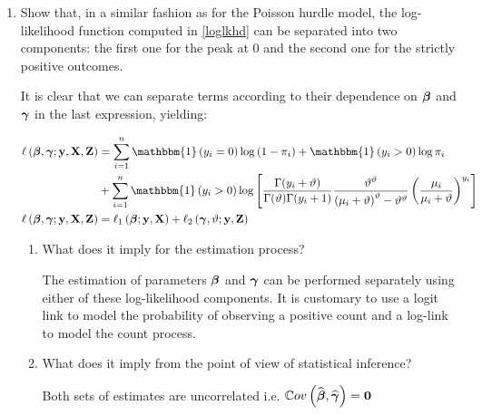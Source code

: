 \documentclass[a4paper,12pt]{article}\usepackage[]{graphicx}\usepackage[]{color}
\def\by{\mathbf{y}}
\def\bbeta{\mbox{\boldmath $\beta$}}
\def\bgamma{\mbox{\boldmath $\gamma$}}
\def\bX{\mathbf{X}}
\def\bZ{\mathbf{Z}}
\def\op{\left(}
\def\cp{\right)}
\def\oc{\left[}
\def\cc{\right]}
\begin{document}
\begin{enumerate}[ref=\bf{\alph*)}]
Yielding the likelihood : 
$$
\mathcal{L}\op \bbeta, \bgamma  ; \by ,  \bX , \bZ  \cp 
= \prod_{i=1}^n 
\oc 1- \pi_i \cc^{\mathbbm{1}\op y_i =  0 \cp}
\oc 
\pi_i
\frac {\Gamma(y_i+\vartheta)}{\Gamma(\vartheta)\Gamma(y_i+1)} 
\frac{\vartheta^\vartheta}{\op\mu_i+\vartheta\cp^\vartheta - \vartheta^\vartheta}
\op\frac{\mu_i}{\mu_i+\vartheta}\cp^{y_i} 
\cc^{\mathbbm{1}\op y_i >  0 \cp}
$$ 
And the log-likelihood : 
\begin{align*}
\ell\op \bbeta, \bgamma  ; \by ,  \bX , \bZ  \cp 
&= \sum_{i=1}^n 
{\mathbbm{1}\op y_i =  0 \cp} \log \op 1- \pi_i \cp + {\mathbbm{1}\op y_i >  0 \cp} \log \pi_i \\
&+ 
{\mathbbm{1}\op y_i >  0 \cp}\log 
\oc 
\frac {\Gamma(y_i+\vartheta)}{\Gamma(\vartheta)\Gamma(y_i+1)} 
\frac{\vartheta^\vartheta}{\op\mu_i+\vartheta\cp^\vartheta - \vartheta^\vartheta}
\op\frac{\mu_i}{\mu_i+\vartheta}\cp^{y_i} 
\cc 
\end{align*} 

\color{black}

\item{Show that, in a similar fashion as for the Poisson hurdle model, the log-likelihood function computed in \ref{loglkhd} can be separated into two components: the first one for the peak at 0 and the second one for the strictly positive outcomes.

\color{blue} 

It is clear that we can separate terms according to their dependence on $\bbeta$ and $\bgamma$ in the last expression, yielding:

\begin{align*}
\ell \op \bbeta, \bgamma  ; \by ,  \bX , \bZ  \cp 
&= \sum_{i=1}^n 
{\mathbbm{1}\op y_i =  0 \cp} \log \op 1- \pi_i \cp + {\mathbbm{1}\op y_i >  0 \cp} \log \pi_i \\
&+ 
\sum_{i=1}^n 
{\mathbbm{1}\op y_i >  0 \cp}\log 
\oc 
\frac {\Gamma(y_i+\vartheta)}{\Gamma(\vartheta)\Gamma(y_i+1)} 
\frac{\vartheta^\vartheta}{\op\mu_i+\vartheta\cp^\vartheta - \vartheta^\vartheta}
\op\frac{\mu_i}{\mu_i+\vartheta}\cp^{y_i} 
\cc \\
\ell \op \bbeta, \bgamma  ; \by ,  \bX , \bZ  \cp 
&= \ell_1\op\bbeta ; \by, \bX\cp + \ell_2\op \bgamma, \vartheta ; \by, \bZ \cp 
\end{align*}  
\color{black}
\begin{enumerate}
\item What does it imply for the estimation process?

\color{blue} 
The estimation of parameters $\bbeta$ and $\bgamma$ can be performed separately using either of these log-likelihood components. It is customary to use a logit link to model the probability of observing a positive count and a log-link to model the count process.  

\color{black}
\item What does it imply from the point of view of statistical inference?

\color{blue} 
Both sets of estimates are uncorrelated i.e. $\mathbb{C}ov\op\widehat{\bbeta} , \widehat{\bgamma}\cp = \mathbf{0}$  \color{black}
\end{enumerate}}
\end{enumerate}
\end{document}
